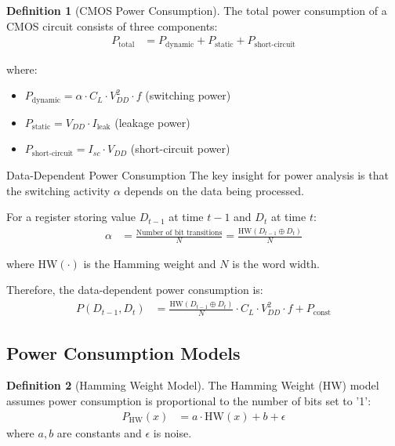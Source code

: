 \documentclass[11pt,a4paper]{article}
\theoremstyle{definition}
\newtheorem{definition}{Definition}[section]
\begin{document}
\begin{definition}[CMOS Power Consumption]
The total power consumption of a CMOS circuit consists of three components:
\begin{align}
P_{\text{total}} &= P_{\text{dynamic}} + P_{\text{static}} + P_{\text{short-circuit}}
\end{align}

where:
\begin{itemize}
    \item $P_{\text{dynamic}} = \alpha \cdot C_L \cdot V_{DD}^2 \cdot f$ (switching power)
    \item $P_{\text{static}} = V_{DD} \cdot I_{\text{leak}}$ (leakage power)  
    \item $P_{\text{short-circuit}} = I_{sc} \cdot V_{DD}$ (short-circuit power)
\end{itemize}
\end{definition}

\begin{mathematicsbox}{Data-Dependent Power Consumption}
The key insight for power analysis is that the switching activity $\alpha$ depends on the data being processed.

For a register storing value $D_{t-1}$ at time $t-1$ and $D_t$ at time $t$:
\begin{align}
\alpha &= \frac{\text{Number of bit transitions}}{N} = \frac{\text{HW}(D_{t-1} \oplus D_t)}{N}
\end{align}

where $\text{HW}(\cdot)$ is the Hamming weight and $N$ is the word width.

Therefore, the data-dependent power consumption is:
\begin{align}
P(D_{t-1}, D_t) &= \frac{\text{HW}(D_{t-1} \oplus D_t)}{N} \cdot C_L \cdot V_{DD}^2 \cdot f + P_{\text{const}}
\end{align}
\end{mathematicsbox}

\subsection{Power Consumption Models}

\begin{definition}[Hamming Weight Model]
The Hamming Weight (HW) model assumes power consumption is proportional to the number of bits set to '1':
\begin{align}
P_{\text{HW}}(x) &= a \cdot \text{HW}(x) + b + \epsilon
\end{align}
where $a, b$ are constants and $\epsilon$ is noise.
\end{definition}
\end{document}
